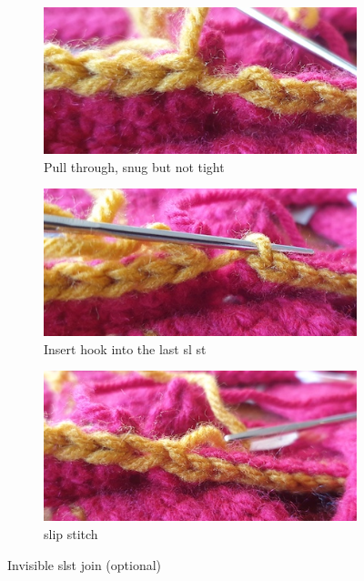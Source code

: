 \documentclass[openany]{book}
\begin{document}
\begin{figure}[H]
\begin{subfigure}[t]{.3\textwidth}\centering
\includegraphics[width=.95\textwidth]{bk/join4}
\caption{Pull through, snug but not tight}
\end{subfigure}
%
\begin{subfigure}[t]{.3\textwidth}
		\centering
		\includegraphics[width=.95\textwidth]{bk/join5}
\caption{Insert hook into the last sl st}
\end{subfigure}
%
\begin{subfigure}[t]{.3\textwidth}
		\centering
		\includegraphics[width=.95\textwidth]{bk/join6}
\caption{slip stitch}
\end{subfigure}
\caption{Invisible slst join (optional)}
\end{figure}
\end{document}
